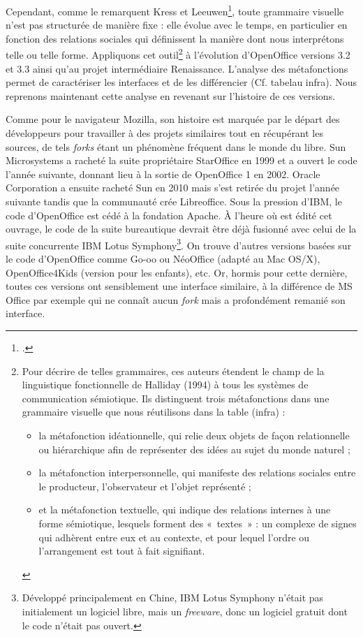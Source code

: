\documentclass{FramateX}
\begin{document}
\begin{refsection}
Cependant, comme le remarquent Kress et Leeuwen\footnote{\cite{kressreading2006}.}, toute grammaire
visuelle n'est pas structurée de manière fixe : elle évolue avec le
temps, en particulier en fonction des relations sociales qui
définissent la manière dont nous interprétons telle ou telle forme.
Appliquons cet outil\footnote{Pour décrire de
telles grammaires, ces auteurs étendent le champ de la linguistique
fonctionnelle de Halliday (1994) à tous les systèmes de communication
sémiotique. Ils distinguent trois métafonctions dans une grammaire
visuelle que nous réutilisons dans la table (infra) : \begin{itemize}
\item la métafonction idéationnelle, qui relie deux objets de façon
relationnelle ou hiérarchique afin de représenter des idées au sujet du
monde naturel ;
\item la métafonction interpersonnelle, qui manifeste des relations
sociales entre le producteur, l'observateur et l'objet représenté ;
\item et la métafonction textuelle, qui indique des relations internes à
une forme sémiotique, lesquels forment des «~textes~» : un complexe de
signes qui adhèrent entre eux et au contexte, et pour lequel l'ordre ou
l'arrangement est tout à fait signifiant.
\end{itemize}
} à l'évolution d'OpenOffice versions 3.2 et 3.3 ainsi qu'au projet
intermédiaire Renaissance. L'analyse des métafonctions permet de
caractériser les interfaces et de les différencier (Cf. tabelau infra). Nous reprenons maintenant cette analyse en
revenant sur l'histoire de ces versions. 

Comme pour le navigateur Mozilla, son histoire est marquée par le départ
des développeurs pour travailler à des projets similaires tout en
récupérant les sources, de tels \textit{forks} étant un phénomène
fréquent dans le monde du libre. Sun Microsystems a racheté la suite
propriétaire StarOffice en 1999 et a ouvert le code l'année suivante,
donnant lieu à la sortie de OpenOffice 1 en 2002. Oracle Corporation a
ensuite racheté Sun en 2010 mais s'est retirée du projet l'année
suivante tandis que la communauté crée Libreoffice. Sous la pression
d'IBM, le code d'OpenOffice est cédé à la fondation Apache. À l'heure
où est édité cet ouvrage, le code de la suite bureautique devrait être
déjà fusionné avec celui de la suite concurrente IBM Lotus Symphony\footnote{Développé principalement en Chine, IBM
Lotus Symphony n'était pas initialement un logiciel libre, mais un
\textit{freeware}, donc un logiciel gratuit dont le code n'était pas
ouvert.}. On trouve d'autres versions basées sur le code d'OpenOffice
comme Go-oo ou NéoOffice (adapté au Mac OS/X), OpenOffice4Kids (version
pour les enfants), etc. Or, hormis pour cette dernière, toutes ces
versions ont sensiblement une interface similaire, à la différence de
MS Office par exemple qui ne connaît aucun \textit{fork} mais a
profondément remanié son interface. 


\end{refsection}
\end{document}
